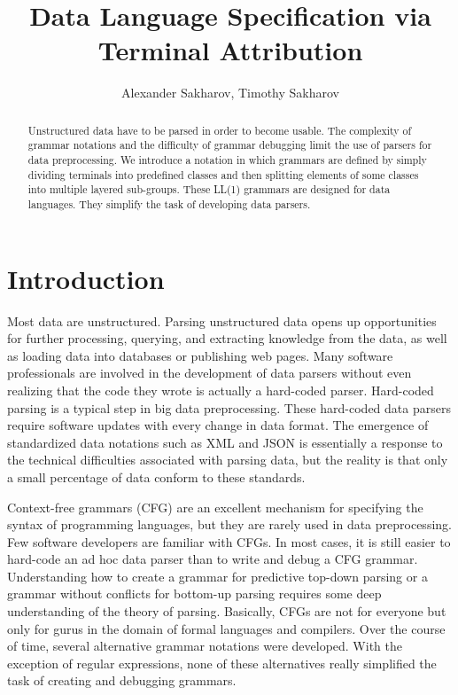 \documentclass{llncs}
\begin{document}
\title{Data Language Specification via Terminal Attribution}

\author{Alexander Sakharov, Timothy Sakharov}

\institute{}

\maketitle

\begin{abstract}
Unstructured data have to be parsed in order to become usable. The complexity of grammar notations and the difficulty of grammar debugging limit the use of parsers for data preprocessing. We introduce a notation in which grammars are defined by simply dividing terminals into predefined classes and then splitting elements of some classes into multiple layered sub-groups. These LL(1) grammars are designed for data languages. They simplify the task of developing data parsers.
\end{abstract}

\section{Introduction}
Most data are unstructured. Parsing unstructured data opens up opportunities for further processing, querying, and extracting knowledge from the data, as well as loading data into databases or publishing web pages. Many software professionals are involved in the development of data parsers without even realizing that the code they wrote is actually a hard-coded parser. Hard-coded parsing is a typical step in big data preprocessing. These hard-coded data parsers require software updates with every change in data format. The emergence of standardized data notations such as XML and JSON is essentially a response to the technical difficulties associated with parsing data, but the reality is that only a small percentage of data conform to these standards.

Context-free grammars (CFG) \cite{Aho06} are an excellent mechanism for specifying the syntax of programming languages, but they are rarely used in data preprocessing. Few software developers are familiar with CFGs. In most cases, it is still easier to hard-code an ad hoc data parser than to write and debug a CFG grammar. Understanding how to create a grammar for predictive top-down parsing or a grammar without conflicts for bottom-up parsing requires some deep understanding of the theory of parsing. Basically, CFGs are not for everyone but only for gurus in the domain of formal languages and compilers. Over the course of time, several alternative grammar notations were developed. With the exception of regular expressions, none of these alternatives really simplified the task of creating and debugging grammars. 
\end{document}
